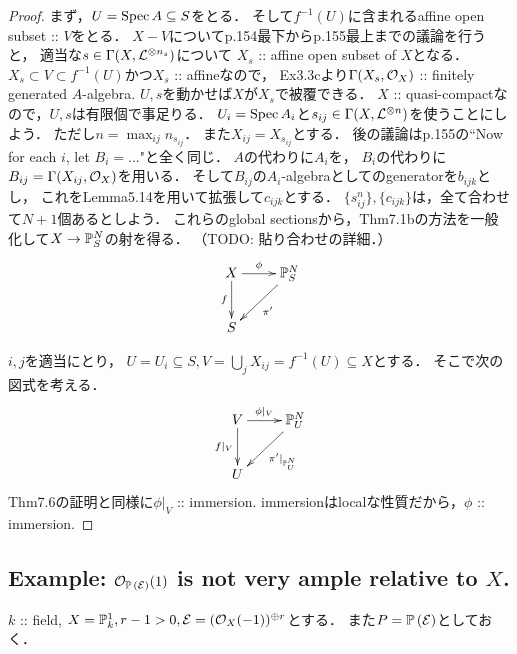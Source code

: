 \documentclass[a4paper]{jsarticle}
\newcommand{\pbundle}{\mathbb{P}\,}
\begin{document}
    \begin{proof}
        まず，$U=\operatorname{Spec} A \subseteq S$をとる．
        そして$f^{-1}(U)$に含まれるaffine open subset :: $V$をとる．
        $X-V$についてp.154最下からp.155最上までの議論を行うと，
        適当な$s \in \Gamma(X, \mathcal{L}^{\otimes n_s})$について
        $X_s$ :: affine open subset of $X$となる．
        $X_s \subset V \subset f^{-1}(U)$かつ$X_s$ :: affineなので，
        Ex3.3cより$\Gamma(X_s, \mathcal{O}_X)$ :: finitely generated $A$-algebra.
        $U, s$を動かせば$X$が$X_s$で被覆できる．
        $X$ :: quasi-compactなので，$U, s$は有限個で事足りる．
        $U_i=\operatorname{Spec} A_i$と$s_{ij} \in \Gamma(X, \mathcal{L}^{\otimes n})$を使うことにしよう．
        ただし$n=\max_{ij} n_{s_{ij}}$．
        また$X_{ij}=X_{s_{ij}}$とする．
        後の議論はp.155の``Now for each $i$, let $B_i=$..."と全く同じ．
        $A$の代わりに$A_i$を，
        $B_i$の代わりに$B_{ij}=\Gamma(X_{ij}, \mathcal{O}_X)$を用いる．
        そして$B_{ij}$の$A_i$-algebraとしてのgeneratorを$b_{ijk}$とし，
        これをLemma5.14を用いて拡張して$c_{ijk}$とする．
        $\{ s_{ij}^n \},\{ c_{ijk} \}$は，全て合わせて$N+1$個あるとしよう．
        これらのglobal sectionsから，Thm7.1bの方法を一般化して$X \to \mathbb{P}^N_S$の射を得る．
        （TODO: 貼り合わせの詳細．）
        \[
        \xymatrix
        {
            X \ar[d]_-{f}\ar[r]^-{\phi}& \proj^N_S \ar[ld]^-{\pi'}\\
            S & {}
        }
        \]

        $i,j$を適当にとり，
        $U=U_i \subseteq S, V=\bigcup_j X_{ij}=f^{-1}(U) \subseteq X$とする．
        そこで次の図式を考える．
        \[
        \xymatrix
        {
            V \ar[d]_-{f|_V}\ar[r]^-{\phi|_V}& \proj^N_U \ar[ld]^-{\pi'|_{\proj^N_U}}\\
            U & {}
        }
        \]
        Thm7.6の証明と同様に$\phi|_V$ :: immersion.
        immersionはlocalな性質だから，$\phi$ :: immersion.
    \end{proof}

    \subsection{Example: $\shO_{\pbundle(\shE)}(1)$ is not very ample relative to $X$.}
    $k$ :: field, $X=\mathbb{P}^1_k, r-1>0, \mathcal{E}=(\mathcal{O}_X(-1))^{\oplus r}$とする．
    また$P=\pbundle(\shE)$としておく．
\end{document}
